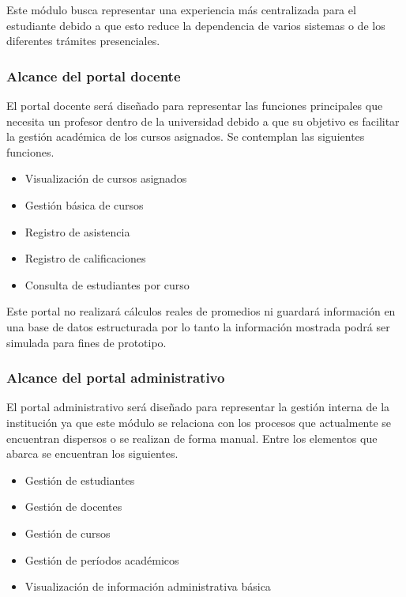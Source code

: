 \documentclass[11pt,spanish]{article}
\begin{document}
Este módulo busca representar una experiencia más centralizada para el estudiante debido a que esto reduce la dependencia de varios sistemas o de los diferentes trámites presenciales.

\subsubsection{Alcance del portal docente}

El portal docente será diseñado para representar las funciones principales que necesita un profesor dentro de la universidad debido a que su objetivo es facilitar la gestión académica de los cursos asignados. Se contemplan las siguientes funciones.

\begin{itemize}
    \item Visualización de cursos asignados
    \item Gestión básica de cursos
    \item Registro de asistencia
    \item Registro de calificaciones
    \item Consulta de estudiantes por curso
\end{itemize}

Este portal no realizará cálculos reales de promedios ni guardará información en una base de datos estructurada por lo tanto la información mostrada podrá ser simulada para fines de prototipo.

\subsubsection{Alcance del portal administrativo}

El portal administrativo será diseñado para representar la gestión interna de la institución ya que este módulo se relaciona con los procesos que actualmente se encuentran dispersos o se realizan de forma manual. Entre los elementos que abarca se encuentran los siguientes.

\begin{itemize}
    \item Gestión de estudiantes
    \item Gestión de docentes
    \item Gestión de cursos
    \item Gestión de períodos académicos
    \item Visualización de información administrativa básica
\end{itemize}
\end{document}
